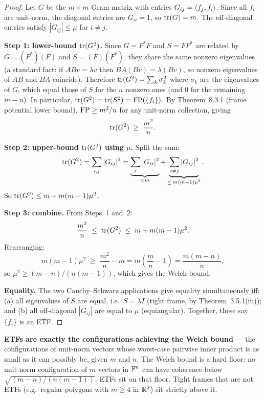 \begin{proof}
Let $G$ be the $m\times m$ Gram matrix with entries $G_{ij}=
\left\langle f_j, f_i \right\rangle$. Since all $f_i$ are unit-norm, the diagonal entries
are $G_{ii}=1$, so $\operatorname{tr}(G)=m$. The off-diagonal entries satisfy
$|G_{ij}|\le\mu$ for $i\ne j$.

\textbf{Step 1: lower-bound $\operatorname{tr}(G^2)$.}
Since $G=F^*F$ and $S=FF^*$ are related by $G=(F^*)(F)$ and $S=(F)(F^*)$,
they share the same nonzero eigenvalues (a standard fact: if $ABv=\lambda v$
then $BA(Bv)=\lambda(Bv)$, so nonzero eigenvalues of $AB$ and $BA$ coincide).
Therefore $\operatorname{tr}(G^2)=\sum_{k}\sigma_k^2$ where $\sigma_k$ are the eigenvalues
of $G$, which equal those of $S$ for the $n$ nonzero ones (and $0$ for the
remaining $m-n$). In particular, $\operatorname{tr}(G^2)=\operatorname{tr}(S^2)=\operatorname{FP}(\{f_i\})$. By
Theorem~8.3.1 (frame potential lower bound), $\operatorname{FP}\ge m^2/n$ for any
unit-norm collection, giving
\[
  \operatorname{tr}(G^2) \;\ge\; \frac{m^2}{n}.
\]

\textbf{Step 2: upper-bound $\operatorname{tr}(G^2)$ using $\mu$.} Split the sum:
\[
  \operatorname{tr}(G^2)=\sum_{i,j}|G_{ij}|^2
  = \underbrace{\sum_i |G_{ii}|^2}_{=m}
    + \underbrace{\sum_{i\ne j}|G_{ij}|^2}_{\le\,m(m-1)\mu^2}.
\]
So $\operatorname{tr}(G^2)\le m + m(m-1)\mu^2$.

\textbf{Step 3: combine.} From Steps~1 and~2:
\[
  \frac{m^2}{n} \;\le\; \operatorname{tr}(G^2) \;\le\; m + m(m-1)\mu^2.
\]
Rearranging:
\[
  m(m-1)\mu^2 \;\ge\; \frac{m^2}{n} - m = m\!\left(\frac{m}{n}-1\right)
  = \frac{m(m-n)}{n},
\]
so $\mu^2 \ge (m-n)/(n(m-1))$, which gives the Welch bound.

\textbf{Equality.} The two Cauchy--Schwarz applications give equality
simultaneously iff: (a) all eigenvalues of $S$ are equal, i.e.\ $S=\lambda
I$ (tight frame, by Theorem~3.5.1(iii)); and (b) all off-diagonal
$|G_{ij}|$ are equal to $\mu$ (equiangular). Together, these say
$\{f_i\}$ is an ETF.
\end{proof}

\begin{keyidea}
\textbf{ETFs are exactly the configurations achieving the Welch bound}
--- the configurations of unit-norm vectors whose worst-case pairwise
inner product is as small as it can possibly be, given $m$ and $n$. The
Welch bound is a hard floor: no unit-norm configuration of $m$ vectors
in $\mathbb{F}^n$ can have coherence below $\sqrt{(m-n)/(n(m-1))}$. ETFs sit on
that floor. Tight frames that are not ETFs (e.g.\ regular polygons with
$m\ge4$ in $\mathbb{R}^2$) sit strictly above it.
\end{keyidea}

